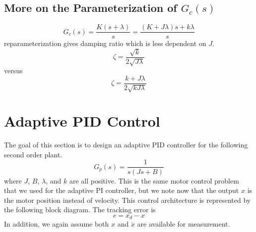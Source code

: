 \subsection{More on the Parameterization of \texorpdfstring{$G_{c}(s)$}{Gc(s)}}

\begin{equation*}
  G_{c}(s)=\frac{K(s+\lambda)}{s}=\frac{(K+J\lambda)s+k\lambda}{s}
\end{equation*}
reparameterization gives damping ratio which is less dependent on $J$.
\begin{equation*}
  \zeta=\frac{\sqrt{k}}{2\sqrt{J\lambda}}
\end{equation*}
versus
\begin{equation*}
  \zeta=\frac{k+J\lambda}{2\sqrt{kJ\lambda}}
\end{equation*}




\section{Adaptive PID Control}

The goal of this section is to design an adaptive PID controller for the following second order plant.
\begin{equation*}
  G_{p}(s)=\frac{1}{s(Js+B)}
\end{equation*}
where $J$, $B$, $\lambda$, and $k$ are all positive.
This is the same motor control problem that we used for the adaptive PI controller, but we note now that the output $x$ is the motor position instead of velocity.
This control architecture is represented by the following block diagram.
The tracking error is
\begin{equation*}
  e=x_{d}-x
\end{equation*}
In addition, we again assume both $x$ and $\dot{x}$ are available for measurement.

